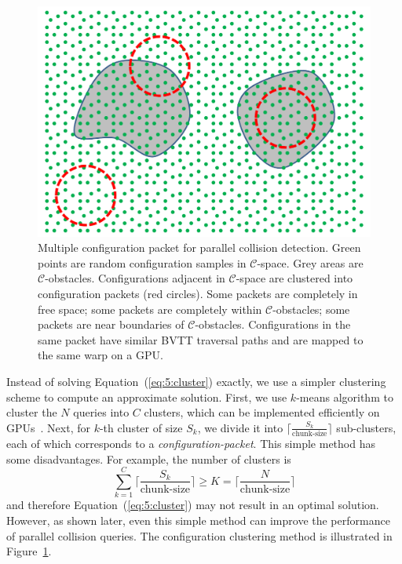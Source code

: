 \begin{figure}[htb]
\centering
\includegraphics[width=\linewidth]{figs/5/collisionpacket.pdf}
\caption[Multiple configuration packet for parallel collision detection]{Multiple configuration packet for parallel collision detection. Green points are random configuration samples in $\mathcal{C}$-space. Grey areas are $\mathcal{C}$-obstacles. Configurations adjacent in $\mathcal{C}$-space are clustered into configuration packets (red circles). Some packets are completely in free space; some packets are completely within $\mathcal{C}$-obstacles; some packets are near boundaries of $\mathcal{C}$-obstacles. Configurations in the
same packet have similar BVTT traversal paths and are mapped to the same warp on a GPU.}
  \label{fig:5:collisionpacket}
\end{figure}

Instead of solving Equation~(\ref{eq:5:cluster}) exactly, we use a simpler clustering scheme to compute an approximate solution. First, we use $k$-means algorithm to cluster the $N$ queries into $C$ clusters, which can be implemented efficiently on GPUs~\cite{Che:2008}. Next, for $k$-th cluster of size $S_k$, we divide it into $\lceil \frac{S_k}{\text{chunk-size}}\rceil$ sub-clusters, each of which corresponds to a \emph{configuration-packet}. This simple method has some disadvantages. For example,
the number of clusters is $$\sum_{k=1}^C \lceil \frac{S_k}{\text{chunk-size}}\rceil \geq K = \lceil \frac{N}{\text{chunk-size}} \rceil$$ and therefore Equation~(\ref{eq:5:cluster}) may not result in an optimal solution. However, as shown later, even this simple method can improve the performance
of parallel collision queries. The configuration clustering method is illustrated in
Figure~\ref{fig:5:collisionpacket}.

